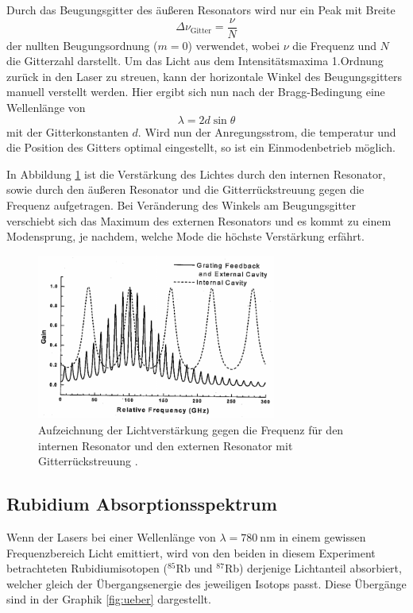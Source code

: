 Durch das Beugungsgitter des äußeren Resonators wird nur ein Peak mit Breite
\begin{equation}
  \Delta\nu_{\text{Gitter}} = \frac{\nu}{N}
\end{equation}
der nullten Beugungsordnung ($m=\num{0}$) verwendet, wobei $\nu$ die Frequenz
und $N$ die Gitterzahl darstellt. Um das Licht aus dem Intensitätsmaxima 1.Ordnung
zurück in den Laser zu streuen, kann der horizontale Winkel \theta des Beugungsgitters
manuell verstellt werden. Hier ergibt sich nun nach der Bragg-Bedingung eine
Wellenlänge von
\begin{equation}
    \lambda = 2d\sin{\theta}
\end{equation}
mit der Gitterkonstanten $d$. Wird nun der Anregungsstrom, die temperatur und die
Position des Gitters optimal eingestellt, so ist ein Einmodenbetrieb möglich.


In Abbildung \ref{fig:gain_freq} ist die Verstärkung des Lichtes durch den internen
Resonator, sowie durch den äußeren Resonator und die Gitterrückstreuung gegen
die Frequenz aufgetragen. Bei Veränderung des Winkels am Beugungsgitter verschiebt
sich das Maximum des externen Resonators und es kommt zu einem Modensprung, je
nachdem, welche Mode die höchste Verstärkung erfährt.

\begin{figure}[htb]
  \centering
  \includegraphics[width=0.7\textwidth]{images/gain-freq.pdf}
  \caption{Aufzeichnung der Lichtverstärkung gegen die Frequenz für den internen
  Resonator und den externen Resonator mit Gitterrückstreuung \cite{anleitung}.}
  \label{fig:gain_freq}
\end{figure}
\newpage

\subsection{Rubidium Absorptionsspektrum}
Wenn der Lasers bei einer Wellenlänge von $\lambda = \SI{780}{\nano\meter}$ in
einem gewissen Frequenzbereich Licht emittiert, wird von den
beiden in diesem Experiment betrachteten Rubidiumisotopen ($^{85}$Rb und $^{87}$Rb)
derjenige Lichtanteil absorbiert, welcher gleich der Übergangsenergie des jeweiligen
Isotops passt. Diese Übergänge sind in der Graphik \ref{fig:ueber} dargestellt.

